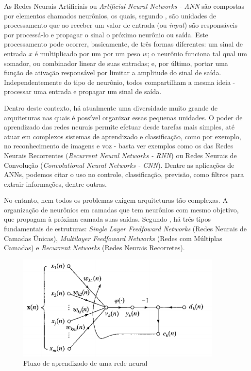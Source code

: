 As Redes Neurais Artificiais ou \textit{Artificial Neural Networks - ANN} são compostas por elementos chamados neurônios, os quais, segundo \cite{Haykin2nd-11}, são unidades de processamento que ao receber um valor de entrada (ou \textit{input}) são responsáveis por processá-lo e propagar o sinal o próximo neurônio ou saída. Este processamento pode ocorrer, basicamente, de três formas diferentes: um sinal de entrada $x$ é multiplicado por um por um peso $w$; o neurônio funciona tal qual um somador, ou combinador linear de suas entradas; e, por último, portar uma função de ativação responsável por limitar a amplitude do sinal de saída. Independentemente do tipo de neurônio, todos compartilham a mesma ideia - processar uma entrada e propagar um sinal de saída. 

Dentro deste contexto, há atualmente uma diversidade muito grande de arquiteturas nas quais é possível organizar essas pequenas unidades. O poder de aprendizado das redes neurais permite efetuar desde tarefas mais simples, até atuar em complexos sistemas de aprendizado e classificação, como por exemplo, no reconhecimento de imagens e voz - basta ver exemplos como os das Redes Neurais Recorrentes (\textit{Recurrent Neural Networks - RNN})\cite{rnn} ou Redes Neurais de Convolução (\textit{Convolutional Neural Networks - CNN}). Dentre as aplicações de ANNs, podemos citar o uso no controle, classificação, previsão, como filtros para extrair informações, dentre outras. 

No entanto, nem todos os problemas exigem arquiteturas tão complexas. A organização de neurônios em camadas que tem neurônios com mesmo objetivo, que propagam à próxima camada suas saídas. Segundo \cite{Haykin2nd-21a23}, há três tipos fundamentais de estruturas: \textit{Single Layer Feedfoward Networks} (Redes Neurais de Camadas Únicas), \textit{Multilayer Feedfoward Networks} (Redes com Múltiplas Camadas) e \textit{Recurrent Networks} (Redes Neurais Recorretes). 

\begin{figure}[ht!]
	\caption{Fluxo de aprendizado de uma rede neural}
	\label{fig:annfluxo}
	\begin{center}
		\includegraphics[scale=0.8]{img/annflowlearning.png}
	\end{center}
\end{figure}

